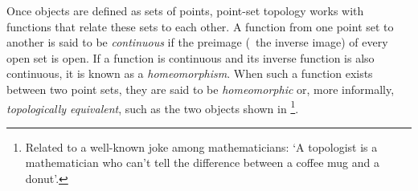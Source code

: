 Once objects are defined as sets of points, point-set topology works with functions that relate these sets to each other.
A function from one point set to another is said to be \emph{continuous} if the preimage (\ie\ the inverse image) of every open set is open.
If a function is continuous and its inverse function is also continuous, it is known as a \emph{homeomorphism}.
When such a function exists between two point sets, they are said to be \emph{homeomorphic} or, more informally, \emph{topologically equivalent}, such as the two objects shown in \footnote{Related to a well-known joke among mathematicians: `A topologist is a mathematician who can't tell the difference between a coffee mug and a donut'.}.

\begin{figure}[tbp]
\centering
{} \quad
{}

\end{figure}
